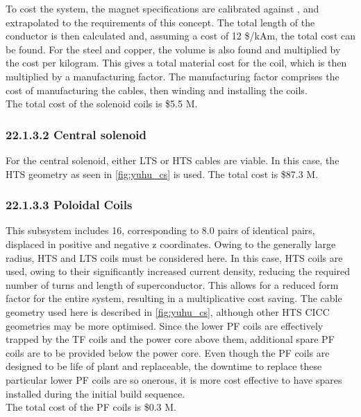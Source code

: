 To cost the system, the magnet specifications are calibrated against \cite{Menard2016}, and extrapolated to the requirements of this concept. The total length of the conductor is then calculated and, assuming a cost of 12 \$/kAm, the total cost can be found. For the steel and copper, the volume is also found and multiplied by the cost per kilogram. This gives a total material cost for the coil, which is then multiplied by a manufacturing factor. The manufacturing factor comprises the cost of manufacturing the cables, then winding and installing the coils. \\

The total cost of the solenoid coils is \$5.5 M.

\subsubsection*{22.1.3.2 Central solenoid}

For the central solenoid, either LTS or HTS cables are viable. In this case, the HTS geometry as seen in \ref{fig:yuhu_cs} is used. The total cost is \$87.3 M.

\subsubsection*{22.1.3.3 Poloidal Coils}

This subsystem includes 16, corresponding to 8.0 pairs of identical pairs, displaced in positive and negative z coordinates. Owing to the generally large radius, HTS and LTS coils must be considered here. In this case, HTS coils are used, owing to their significantly increased current density, reducing the required number of turns and length of superconductor. This allows for a reduced form factor for the entire system, resulting in a multiplicative cost saving. The cable geometry used here is described in \ref{fig:yuhu_cs}, although other HTS CICC geometries may be more optimised.
Since the lower PF coils are effectively trapped by the TF coils and the power core above them, additional spare PF coils are to be provided below the power core. Even though the PF coils are designed to be life of plant and replaceable, the downtime to replace these particular lower PF coils are so onerous, it is more cost effective to have spares installed during the initial build sequence.  \\

The total cost of the PF coils is \$0.3 M. \\

